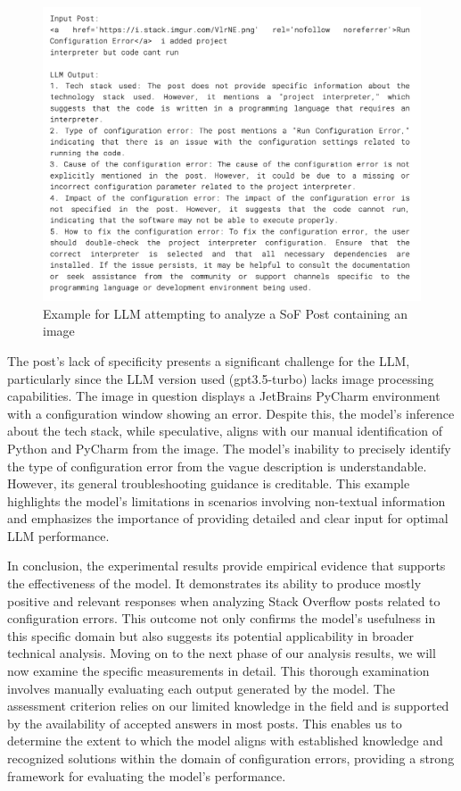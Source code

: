 \documentclass[english,bachelor]{swsLeipzig}
\begin{document}
\begin{figure}[h]
  \centering
  \includegraphics[width=1\textwidth]{images/failanalysis.png}
  \caption{Example for LLM attempting to analyze a SoF Post containing an image}
  \label{fig:figure513}
\end{figure}

The post's lack of specificity presents a significant challenge for the LLM, particularly since the LLM 
version used (gpt3.5-turbo) lacks image processing capabilities. The image in question displays a JetBrains PyCharm environment with a configuration window showing an error. Despite this, the model's inference about the tech stack, while speculative, aligns with our manual identification of Python and PyCharm from the image. The model's inability to precisely identify the type of configuration error from the vague description is understandable. However, its general troubleshooting guidance is creditable. This example highlights the model's limitations in scenarios involving non-textual information and emphasizes the importance of providing detailed and clear input for optimal LLM performance.

In conclusion, the experimental results provide empirical evidence that supports the effectiveness of 
the model. It demonstrates its ability to produce mostly positive and relevant responses when analyzing Stack Overflow posts related to configuration errors. This outcome not only confirms the model's usefulness in this specific domain but also suggests its potential applicability in broader technical analysis. Moving on to the next phase of our analysis results, we will now examine the specific measurements in detail. This thorough examination involves manually evaluating each output generated by the model. The assessment criterion relies on our limited knowledge in the field and is supported by the availability of accepted answers in most posts. This enables us to determine the extent to which the model aligns with established knowledge and recognized solutions within the domain of configuration errors, providing a strong framework for evaluating the model's performance.
\end{document}
